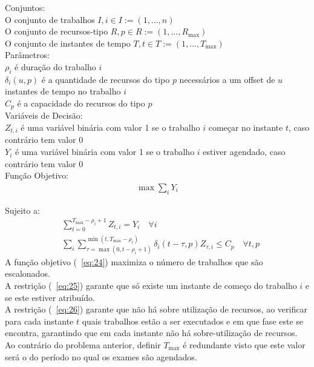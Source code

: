 Conjuntos:\\
O conjunto de trabalhos $I, i \in I := (1, \ldots, n)$ \\
O conjunto de recursos-tipo $R, p \in R := (1, \ldots, R_{\max})$ \\
O conjunto de instantes de tempo $T, t \in T := (1, \ldots, T_{\max})$ \\

Parâmetros:\\
$\rho_{i}$ é duração do trabalho $i$ \\
$\delta_{i}(u,p)$ é a quantidade de recursos do tipo $p$ necessários a um offset de $u$ instantes de tempo no trabalho $i$\\
$C_{p}$ é a capacidade do recursos do tipo $p$ \\

Variáveis de Decisão: \\
$Z_{t,i}$ é uma variável binária com valor 1 se o trabalho $i$ começar no instante $t$, caso contrário tem valor 0 \\
$Y_{i}$ é uma variável binária com valor 1 se o trabalho $i$ estiver agendado, caso contrário tem valor 0 \\

Função Objetivo:
\begin{align}
\max \sum_{i}Y_{i} \label{eq:24}
\end{align}

Sujeito a:
\begin{align}
&\sum^{T_{\max}-\rho_{i}+1}_{t=0}Z_{t,i} = Y_{i} \quad \forall i \label{eq:25} \\
&\sum_{i}\sum^{\min(t, T_{\max}-\rho_{i})}_{\tau=\max(0, t-\rho_{i}+1)}\delta_{i}(t-\tau,p)Z_{\tau,i} \leq C_{p} \quad \forall t,p \label{eq:26}
\end{align}
A função objetivo (~\ref{eq:24}) maximiza o número de trabalhos que são escalonados.\\
A restrição (~\ref{eq:25}) garante que só existe um instante de começo do trabalho $i$ e se este estiver atribuído.\\
A restrição (~\ref{eq:26}) garante que não há sobre utilização de recursos, ao verificar para cada instante $t$ quais trabalhos estão a ser executados e em que fase este se encontra, garantindo que em cada instante não há sobre-utilização de recursos.\\

Ao contrário do problema anterior, definir $T_{\max}$ é redundante visto que este valor será o do período no qual os exames são agendados. \\

